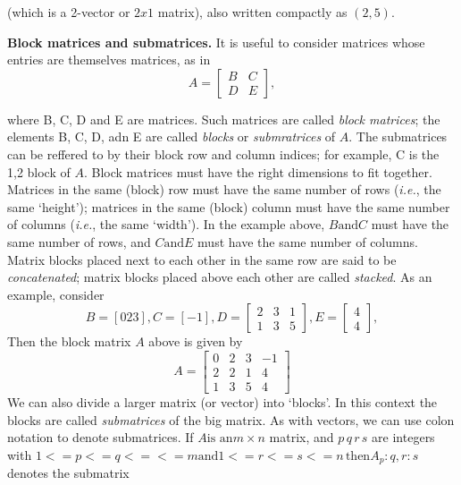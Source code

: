 \documentclass[11pt,oneside,a4paper,openright]{article}
\begin{document}
(which is a 2-vector or $2 x 1$ matrix), also written compactly as $(2,5)$.

\textbf{Block matrices and submatrices.} It is useful to consider matrices whose entries are themselves matrices, as in
\begin{equation}
A = \begin{bmatrix}
    B & C\\
    D & E
    \end{bmatrix},    
\end{equation}

where B, C, D and E are matrices. Such matrices are called \emph{block matrices}; the elements B, C, D, adn E are called
\emph{blocks} or \emph{submratrices} of $A$. The submatrices can be reffered to by their block row and column indices; for example, C is the 
1,2 block of $A$.
Block matrices must have the right dimensions to fit together. Matrices in the
same (block) row must have the same number of rows (\emph{i.e.}, the same ‘height’);
matrices in the same (block) column must have the same number of columns (\emph{i.e.},
the same ‘width’). In the example above, $B \text{and} C$ must have the same number of
rows, and $C \text{and} E$ must have the same number of columns. Matrix blocks placed
next to each other in the same row are said to be \emph{concatenated}; matrix blocks
placed above each other are called \emph{stacked}.
As an example, consider
\begin{equation}
    B=[0 2 3], C=[-1], D= \begin{bmatrix}
        2 & 3 & 1\\
        1 & 3 & 5
        \end{bmatrix}, E= \begin{bmatrix}
            4\\
            4
        \end{bmatrix},
\end{equation}
Then the block matrix $A$ above is given by
\begin{equation}\label{6.1}
    A= \begin{bmatrix}
        0 & 2 & 3& -1\\
        2 & 2 & 1& 4\\
        1 & 3 & 5& 4
        \end{bmatrix}
\end{equation}
We can also divide a larger matrix (or vector) into ‘blocks’. In this context the
blocks are called \emph{submatrices} of the big matrix. As with vectors, we can use colon
notation to denote submatrices. If $A \text{is an} m × n$ matrix, and $p\, q\, r\, s$ are integers
with $1 <= p <= q <= <= m \text{and} 1<=r<=s<=n\, \text{then} A_p:q,r:s$ denotes the submatrix
\end{document}
